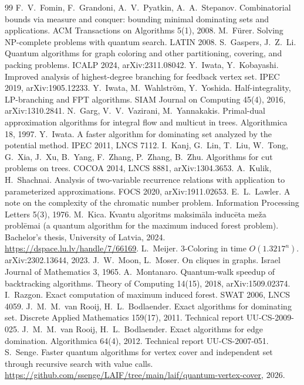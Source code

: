 \documentclass[11pt]{article}
\theoremstyle{remark}
\begin{document}
\begin{thebibliography}{99}
 F.~V.~Fomin, F.~Grandoni, A.~V.~Pyatkin, A.~A.~Stepanov. Combinatorial bounds via measure and conquer: bounding minimal dominating sets and applications. ACM Transactions on Algorithms 5(1), 2008.
 M.~F\"urer. Solving NP-complete problems with quantum search. LATIN 2008.
 S.~Gaspers, J.~Z.~Li. Quantum algorithms for graph coloring and other partitioning, covering, and packing problems. ICALP 2024, arXiv:2311.08042.
 Y.~Iwata, Y.~Kobayashi. Improved analysis of highest-degree branching for feedback vertex set. IPEC 2019, arXiv:1905.12233.
 Y.~Iwata, M.~Wahlstr{\"o}m, Y.~Yoshida. Half-integrality, LP-branching and FPT algorithms. SIAM Journal on Computing 45(4), 2016, arXiv:1310.2841.
 N.~Garg, V.~V.~Vazirani, M.~Yannakakis. Primal-dual approximation algorithms for integral flow and multicut in trees. Algorithmica 18, 1997.
 Y.~Iwata. A faster algorithm for dominating set analyzed by the potential method. IPEC 2011, LNCS 7112.
 I.~Kanj, G.~Lin, T.~Liu, W.~Tong, G.~Xia, J.~Xu, B.~Yang, F.~Zhang, P.~Zhang, B.~Zhu. Algorithms for cut problems on trees. COCOA 2014, LNCS 8881, arXiv:1304.3653.
 A.~Kulik, H.~Shachnai. Analysis of two-variable recurrence relations with application to parameterized approximations. FOCS 2020, arXiv:1911.02653.
 E.~L.~Lawler. A note on the complexity of the chromatic number problem. Information Processing Letters 5(3), 1976.
 M.~Kica. Kvantu algoritms maksim\=ala induc\=eta me\v{z}a probl\=emai (a quantum algorithm for the maximum induced forest problem). Bachelor's thesis, University of Latvia, 2024. \url{https://dspace.lu.lv/handle/7/66169}.
 L.~Meijer. 3-Coloring in time $O(1.3217^n)$. arXiv:2302.13644, 2023.
 J.~W.~Moon, L.~Moser. On cliques in graphs. Israel Journal of Mathematics 3, 1965.
 A.~Montanaro. Quantum-walk speedup of backtracking algorithms. Theory of Computing 14(15), 2018, arXiv:1509.02374.
 I.~Razgon. Exact computation of maximum induced forest. SWAT 2006, LNCS 4059.
 J.~M.~M.~van Rooij, H.~L.~Bodlaender. Exact algorithms for dominating set. Discrete Applied Mathematics 159(17), 2011. Technical report UU-CS-2009-025.
 J.~M.~M.~van Rooij, H.~L.~Bodlaender. Exact algorithms for edge domination. Algorithmica 64(4), 2012. Technical report UU-CS-2007-051.
 S.~Senge. Faster quantum algorithms for vertex cover and independent set through recursive search with value calls. \url{https://github.com/ssenge/LAIF/tree/main/laif/quantum-vertex-cover}, 2026.

\end{thebibliography}
\end{document}

